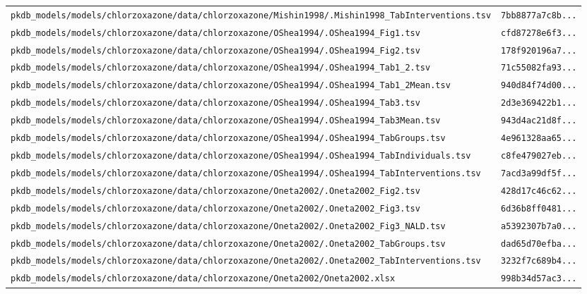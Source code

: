 \documentclass{article}
\begin{document}
\begin{longtable}{ll}
\texttt{pkdb\_models/models/chlorzoxazone/data/chlorzoxazone/Mishin1998/.Mishin1998\_TabInterventions.tsv} & \texttt{7bb8877a7c8b...} \\
\texttt{pkdb\_models/models/chlorzoxazone/data/chlorzoxazone/OShea1994/.OShea1994\_Fig1.tsv} & \texttt{cfd87278e6f3...} \\
\texttt{pkdb\_models/models/chlorzoxazone/data/chlorzoxazone/OShea1994/.OShea1994\_Fig2.tsv} & \texttt{178f920196a7...} \\
\texttt{pkdb\_models/models/chlorzoxazone/data/chlorzoxazone/OShea1994/.OShea1994\_Tab1\_2.tsv} & \texttt{71c55082fa93...} \\
\texttt{pkdb\_models/models/chlorzoxazone/data/chlorzoxazone/OShea1994/.OShea1994\_Tab1\_2Mean.tsv} & \texttt{940d84f74d00...} \\
\texttt{pkdb\_models/models/chlorzoxazone/data/chlorzoxazone/OShea1994/.OShea1994\_Tab3.tsv} & \texttt{2d3e369422b1...} \\
\texttt{pkdb\_models/models/chlorzoxazone/data/chlorzoxazone/OShea1994/.OShea1994\_Tab3Mean.tsv} & \texttt{943d4ac21d8f...} \\
\texttt{pkdb\_models/models/chlorzoxazone/data/chlorzoxazone/OShea1994/.OShea1994\_TabGroups.tsv} & \texttt{4e961328aa65...} \\
\texttt{pkdb\_models/models/chlorzoxazone/data/chlorzoxazone/OShea1994/.OShea1994\_TabIndividuals.tsv} & \texttt{c8fe479027eb...} \\
\texttt{pkdb\_models/models/chlorzoxazone/data/chlorzoxazone/OShea1994/.OShea1994\_TabInterventions.tsv} & \texttt{7acd3a99df5f...} \\
\texttt{pkdb\_models/models/chlorzoxazone/data/chlorzoxazone/Oneta2002/.Oneta2002\_Fig2.tsv} & \texttt{428d17c46c62...} \\
\texttt{pkdb\_models/models/chlorzoxazone/data/chlorzoxazone/Oneta2002/.Oneta2002\_Fig3.tsv} & \texttt{6d36b8ff0481...} \\
\texttt{pkdb\_models/models/chlorzoxazone/data/chlorzoxazone/Oneta2002/.Oneta2002\_Fig3\_NALD.tsv} & \texttt{a5392307b7a0...} \\
\texttt{pkdb\_models/models/chlorzoxazone/data/chlorzoxazone/Oneta2002/.Oneta2002\_TabGroups.tsv} & \texttt{dad65d70efba...} \\
\texttt{pkdb\_models/models/chlorzoxazone/data/chlorzoxazone/Oneta2002/.Oneta2002\_TabInterventions.tsv} & \texttt{3232f7c689b4...} \\
\texttt{pkdb\_models/models/chlorzoxazone/data/chlorzoxazone/Oneta2002/Oneta2002.xlsx} & \texttt{998b34d57ac3...} \\

\end{longtable}
\end{document}

